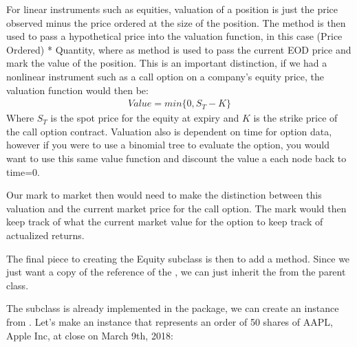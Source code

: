 \documentclass[letterpaper,10pt,english]{sphinxmanual}
\begin{document}
\sphinxAtStartPar
For linear instruments such as equities, valuation of a position is just
the price observed minus the price ordered at the size of the position.
The  method is then used to pass a hypothetical price into
the valuation function, in this case (Price \sphinxhyphen{} Ordered) * Quantity,
where as  method is used to pass the current EOD price
and mark the value of the position. This is an important distinction, if
we had a nonlinear instrument such as a call option on a company’s
equity price, the valuation function would then be:
\begin{equation*}
\begin{split}Value = min\{0, S_{T} - K\}\end{split}
\end{equation*}
\sphinxAtStartPar
Where \(S_{T}\) is the spot price for the equity at expiry and
\(K\) is the strike price of the call option contract. Valuation
also is dependent on time for option data, however if you were to use a
binomial tree to evaluate the option, you would want to use this same
value function and discount the value a each node back to time=0.

\sphinxAtStartPar
Our mark to market then would need to make the distinction between this
valuation and the current market price for the call option. The mark
would then keep track of what the current market value for the option to
keep track of actualized returns.

\sphinxAtStartPar
The final piece to creating the Equity subclass is then to add a
method. Since we just want a copy of the reference
of the , we can just inherit the 
from the  parent class.

\sphinxAtStartPar
The  subclass is already implemented in the package, we can
create an instance from . Let’s make an instance
that represents an order of 50 shares of AAPL, Apple Inc, at close on
March 9th, 2018:
\end{document}
